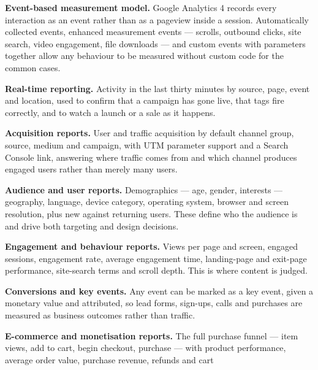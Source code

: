 \begin{qlist}

\begin{apts}
\item \textbf{Event-based measurement model.} Google Analytics 4 records every
      interaction as an event rather than as a pageview inside a session.
      Automatically collected events, enhanced measurement events --- scrolls,
      outbound clicks, site search, video engagement, file downloads --- and
      custom events with parameters together allow any behaviour to be
      measured without custom code for the common cases.
\item \textbf{Real-time reporting.} Activity in the last thirty minutes by
      source, page, event and location, used to confirm that a campaign has
      gone live, that tags fire correctly, and to watch a launch or a sale as
      it happens.
\item \textbf{Acquisition reports.} User and traffic acquisition by default
      channel group, source, medium and campaign, with UTM parameter support
      and a Search Console link, answering where traffic comes from and which
      channel produces engaged users rather than merely many users.
\item \textbf{Audience and user reports.} Demographics --- age, gender,
      interests --- geography, language, device category, operating system,
      browser and screen resolution, plus new against returning users. These
      define who the audience is and drive both targeting and design decisions.
\item \textbf{Engagement and behaviour reports.} Views per page and screen,
      engaged sessions, engagement rate, average engagement time, landing-page
      and exit-page performance, site-search terms and scroll depth. This is
      where content is judged.
\item \textbf{Conversions and key events.} Any event can be marked as a key
      event, given a monetary value and attributed, so lead forms, sign-ups,
      calls and purchases are measured as business outcomes rather than
      traffic.
\item \textbf{E-commerce and monetisation reports.} The full purchase funnel
      --- item views, add to cart, begin checkout, purchase --- with product
      performance, average order value, purchase revenue, refunds and cart

\end{apts}
\end{qlist}
